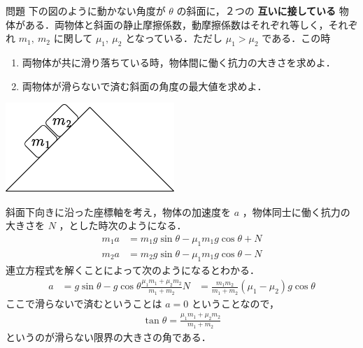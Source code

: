 \documentclass[
  b4paperpaper,
  xelatex,ja=standard]{bxjsbook}
\providecommand{\tightlist}{%
  \setlength{\itemsep}{0pt}\setlength{\parskip}{0pt}}\usepackage{longtable,booktabs,array}
\begin{document}
\begin{Qbox}{問題}
下の図のように動かない角度が \(\theta\) の斜面に，２つの
\textbf{互いに接している}
物体がある．両物体と斜面の静止摩擦係数，動摩擦係数はそれぞれ等しく，それぞれ
\(m_1,\:m_2\) に関して \(\mu _1,\:\mu _2\) となっている．ただし
\(\mu_1>\mu_2\) である．この時

\begin{enumerate}
\def\labelenumi{\arabic{enumi}.}
\tightlist
\item
  両物体が共に滑り落ちている時，物体間に働く抗力の大きさを求めよ．
\item
  両物体が滑らないで済む斜面の角度の最大値を求めよ．
\end{enumerate}

\includegraphics{source/images/newton/newton19.png}

\end{Qbox}


斜面下向きに沿った座標軸を考え，物体の加速度を \(a\)
，物体同士に働く抗力の大きさを \(N\) ，とした時次のようになる．
\begin{align*}
m_1a&=m_1g\sin \theta -\mu_1m_1g\cos \theta +N\\
m_2a&=m_2g\sin \theta -\mu_1m_1g\cos \theta -N
\end{align*} 連立方程式を解くことによって次のようになるとわかる．
\begin{align*}
a&=g\sin \theta - g \cos \theta \frac{\mu_1m_1+\mu_2m_2}{m_1+m_2}
N&=\frac{m_1m_2}{m_1+m_2}(\mu_1-\mu_2)g\cos\theta
\end{align*} ここで滑らないで済むということは \(a=0\) ということなので，
\begin{align*}
\tan \theta = \frac{\mu_1m_1+\mu_2m_2}{m_1+m_2}
\end{align*} というのが滑らない限界の大きさの角である．
\end{document}
